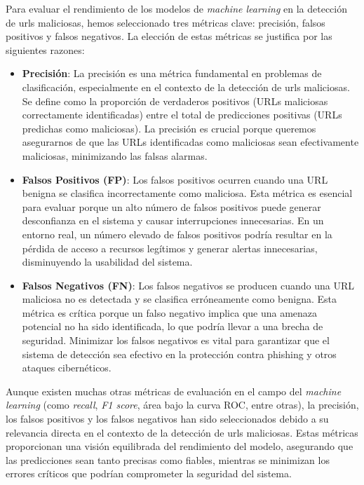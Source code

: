 Para evaluar el rendimiento de los modelos de \textit{machine learning} en la detección de \glspl{url} maliciosas, hemos seleccionado tres métricas clave: precisión, falsos positivos y falsos negativos. La elección de estas métricas se justifica por las siguientes razones:

\begin{itemize}
    \item \textbf{Precisión}: La precisión es una métrica fundamental en problemas de clasificación, especialmente en el contexto de la detección de \glspl{url} maliciosas. Se define como la proporción de verdaderos positivos (URLs maliciosas correctamente identificadas) entre el total de predicciones positivas (URLs predichas como maliciosas). La precisión es crucial porque queremos asegurarnos de que las URLs identificadas como maliciosas sean efectivamente maliciosas, minimizando las falsas alarmas.

    \item \textbf{Falsos Positivos (FP)}: Los falsos positivos ocurren cuando una URL benigna se clasifica incorrectamente como maliciosa. Esta métrica es esencial para evaluar porque un alto número de falsos positivos puede generar desconfianza en el sistema y causar interrupciones innecesarias. En un entorno real, un número elevado de falsos positivos podría resultar en la pérdida de acceso a recursos legítimos y generar alertas innecesarias, disminuyendo la usabilidad del sistema.

    \item \textbf{Falsos Negativos (FN)}: Los falsos negativos se producen cuando una URL maliciosa no es detectada y se clasifica erróneamente como benigna. Esta métrica es crítica porque un falso negativo implica que una amenaza potencial no ha sido identificada, lo que podría llevar a una brecha de seguridad. Minimizar los falsos negativos es vital para garantizar que el sistema de detección sea efectivo en la protección contra \gls{phishing} y otros ataques cibernéticos.

\end{itemize}

Aunque existen muchas otras métricas de evaluación en el campo del \textit{machine learning} (como \textit{recall}, \textit{F1 score}, área bajo la curva ROC, entre otras), la precisión, los falsos positivos y los falsos negativos han sido seleccionados debido a su relevancia directa en el contexto de la detección de \glspl{url} maliciosas. Estas métricas proporcionan una visión equilibrada del rendimiento del modelo, asegurando que las predicciones sean tanto precisas como fiables, mientras se minimizan los errores críticos que podrían comprometer la seguridad del sistema.